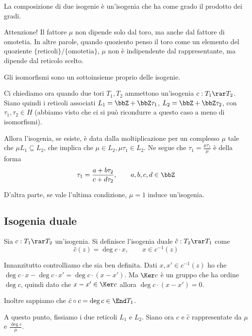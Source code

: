 	\begin{osservazione}
		La composizione di due isogenie è un'isogenia che ha come grado il prodotto dei gradi.
	\end{osservazione}
	
	Attenzione! Il fattore $\mu$ non dipende solo dal toro, ma anche dal fattore di omotetia. In altre parole, quando quoziento penso il toro come un elemento del quoziente $\{ \mbox{reticoli} \} / \{ \mbox{omotetia} \}$, $\mu$ non è indipendente dal rappresentante, ma dipende dal reticolo scelto.
	
	\begin{osservazione} 
		Gli isomorfismi sono un sottoinsieme proprio delle isogenie.
	\end{osservazione}

	Ci chiediamo ora quando due tori $T_1, T_2$ ammettono un'isogenia $c: T_1 \rar T_2$. Siano quindi i reticoli associati $L_1=\bbZ + \bbZ \tau_1$, $L_2=\bbZ + \bbZ \tau_2$, con $\tau_1,\tau_2 \in H$ (abbiamo visto che ci si può ricondurre a questo caso a meno di isomorfismi).
	
	Allora l'isogenia, se esiste, è data dalla moltiplicazione per un complesso $\mu$ tale che $\mu L_1 \subseteq L_2$, che implica che $\mu \in L_2, \mu\tau_1 \in L_2$. Ne segue che $\tau_1 = \frac{\mu\tau_1}{\mu}$ è della forma 
	\[
		\tau_1 = \frac{a + b\tau_2}{c+d\tau_2}, \qquad a,b,c,d \in \bbZ
	\]
	
	D'altra parte, se vale l'ultima condizione, $\mu=1$ induce un'isogenia.

	\subsection{Isogenia duale}
	
	Sia $c: T_1 \rar T_2$ un'isogenia. Si definisce l'isogenia duale $\hat c: T_2 \rar T_1$ come 
	\[
		\hat c(z) = \deg c\cdot x, \qquad x \in c^{-1}(z)
	\]
	
	Innanzitutto controlliamo che sia ben definita. Dati $x, x' \in c^{-1}(z)$ ho che $\deg c \cdot x - \deg c \cdot x' = \deg c \cdot (x-x')$. Ma $\Ker c$ è un gruppo che ha ordine $\deg c$, quindi dato che $x-x' \in \Ker c$ allora $\deg c \cdot (x-x') = 0$.
	
	Inoltre sappiamo che $\hat c \circ c = \deg c \in \End T_1$.
	
	A questo punto, fissiamo i due reticoli $L_1$ e $L_2$. Siano ora $c$ e $\hat c$ rappresentate da $\mu$ e $\frac{\deg c}\mu$.
	
